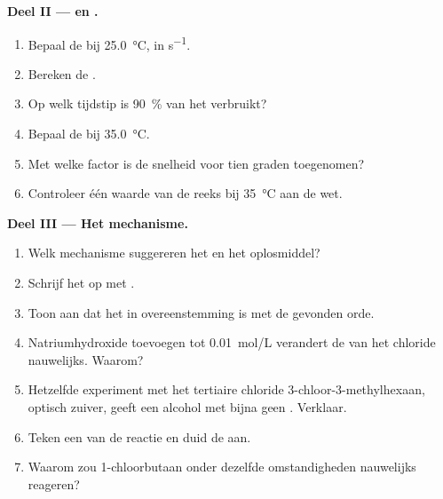 \begin{problem}
\medskip
\noindent\textbf{Deel II ---  en .}
\begin{enumerate}[resume]
  \item Bepaal de  bij \qty{25.0}{\celsius}, in
        \unit{s^{-1}}.
  \item Bereken de .
  \item Op welk tijdstip is \qty{90}{\percent} van het 
        verbruikt?
  \item Bepaal de  bij \qty{35.0}{\celsius}.
  \item Met welke factor is de snelheid voor tien graden toegenomen?
  \item Controleer één waarde van de reeks bij \qty{35}{\celsius} aan de
        wet.
\end{enumerate}

\medskip
\noindent\textbf{Deel III --- Het mechanisme.}
\begin{enumerate}[resume]
  \item Welk mechanisme suggereren het  en het oplosmiddel?
  \item Schrijf het op met .
  \item Toon aan dat het in overeenstemming is met de gevonden orde.
  \item Natriumhydroxide toevoegen tot \qty{0.01}{mol/L} verandert de
         van het chloride nauwelijks. Waarom?
  \item Hetzelfde experiment met het  tertiaire chloride
        3-chloor-3-methylhexaan, optisch zuiver, geeft een alcohol met
        bijna geen . Verklaar.
  \item Teken een  van de reactie en duid de
         aan.
  \item Waarom zou 1-chloorbutaan onder dezelfde omstandigheden nauwelijks
        reageren?
\end{enumerate}


\end{problem}
